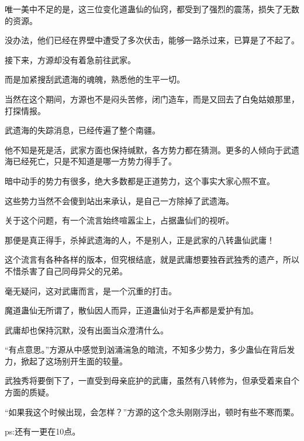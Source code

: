 \begin{this_body}
唯一美中不足的是，这三位变化道蛊仙的仙窍，都受到了强烈的震荡，损失了无数的资源。

没办法，他们已经在界壁中遭受了多次伏击，能够一路杀过来，已算是了不起了。

接下来，方源却没有着急前往武家。

而是加紧搜刮武遗海的魂魄，熟悉他的生平一切。

当然在这个期间，方源也不是闷头苦修，闭门造车，而是又回去了白兔姑娘那里，打探情报。

武遗海的失踪消息，已经传遍了整个南疆。

他不知是死是活，武家方面也保持缄默，各方势力都在猜测。更多的人倾向于武遗海已经死亡，只是不知道是哪一方势力得手了。

暗中动手的势力有很多，绝大多数都是正道势力，这个事实大家心照不宣。

这些势力当然不会傻到站出来承认，是自己一方除掉了武遗海。

关于这个问题，有一个流言始终喧嚣尘上，占据蛊仙们的视听。

那便是真正得手，杀掉武遗海的人，不是别人，正是武家的八转蛊仙武庸！

这个流言有各种各样的版本，但究根结底，就是武庸想要独吞武独秀的遗产，所以不惜杀害了自己同母异父的兄弟。

毫无疑问，这对武庸而言，是一个沉重的打击。

魔道蛊仙无所谓了，散仙因人而异，正道蛊仙对于名声都是爱护有加。

武庸却也保持沉默，没有出面当众澄清什么。

“有点意思。”方源从中感觉到汹涌湍急的暗流，不知多少势力，多少蛊仙在背后发力，掀起了这场别开生面的较量。

武独秀将要倒下了，一直受到母亲庇护的武庸，虽然有八转修为，但承受着来自个方面的质疑。

“如果我这个时候出现，会怎样？”方源的这个念头刚刚浮出，顿时有些不寒而栗。

ps:还有一更在10点。

\end{this_body}

